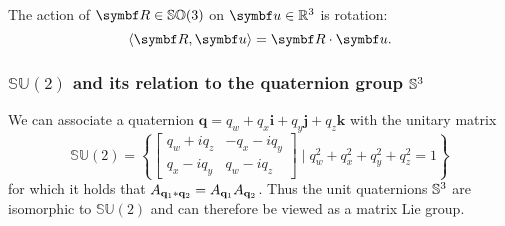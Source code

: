 The action of $\bR \in \SOthree$ on $\bu \in \mathbb{R}^3$ is rotation:
\begin{equation}
  \left \langle \bR, \bu \right \rangle = \bR \cdot \bu.
\end{equation}



\subsubsection{\texorpdfstring{$\mathbb{SU}(2)$}{SU(2)} and its relation to the quaternion group \texorpdfstring{${\mathbb{S}^3}$}{S3}}

We can associate a quaternion $\symbf{q} = q_w + q_x \symbf{i} + q_y \symbf{j} + q_z \symbf{k}$ with the unitary matrix
\begin{equation}
  \label{eq:su2_matrix}
  \mathbb{SU}(2) = \left\{ \begin{bmatrix}
    q_w + i q_z & -q_x - i q_y \\
    q_x - i q_y & q_w - i q_z
  \end{bmatrix} \mid q_w^2 + q_x^2 + q_y^2 + q_z^2 = 1 \right\}
\end{equation}
for which it holds that $A_{\mathbf{q}_1 * \mathbf{q}_2} = A_{\mathbf{q}_1} A_{\mathbf{q}_2}$. Thus the unit quaternions ${\mathbb{S}^3}$ are isomorphic to $\mathbb{SU}(2)$ and can therefore be viewed as a matrix Lie group.


